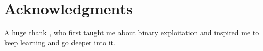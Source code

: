 \chapter*{Acknowledgments}

A huge thank , who first taught me about binary exploitation and inspired me to keep learning and go deeper into it. 